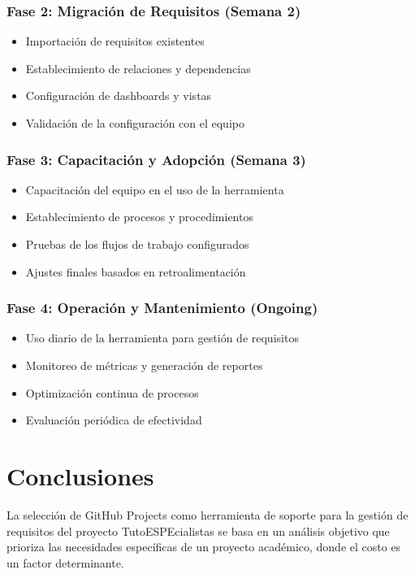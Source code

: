 \documentclass[12pt,a4paper]{article}
\begin{document}
\subsubsection{Fase 2: Migración de Requisitos (Semana 2)}
\begin{itemize}
    \item Importación de requisitos existentes
    \item Establecimiento de relaciones y dependencias
    \item Configuración de dashboards y vistas
    \item Validación de la configuración con el equipo
\end{itemize}

\subsubsection{Fase 3: Capacitación y Adopción (Semana 3)}
\begin{itemize}
    \item Capacitación del equipo en el uso de la herramienta
    \item Establecimiento de procesos y procedimientos
    \item Pruebas de los flujos de trabajo configurados
    \item Ajustes finales basados en retroalimentación
\end{itemize}

\subsubsection{Fase 4: Operación y Mantenimiento (Ongoing)}
\begin{itemize}
    \item Uso diario de la herramienta para gestión de requisitos
    \item Monitoreo de métricas y generación de reportes
    \item Optimización continua de procesos
    \item Evaluación periódica de efectividad
\end{itemize}

\section{Conclusiones}

La selección de GitHub Projects como herramienta de soporte para la gestión de requisitos del proyecto TutoESPEcialistas se basa en un análisis objetivo que prioriza las necesidades específicas de un proyecto académico, donde el costo es un factor determinante.
\end{document}
